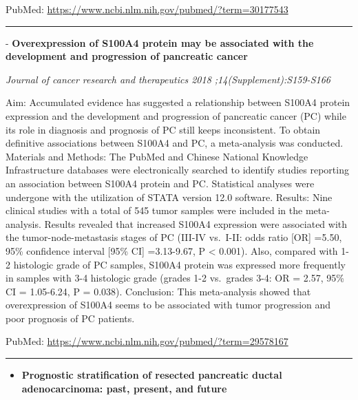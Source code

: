 \documentclass[]{article}
\providecommand{\tightlist}{%
  \setlength{\itemsep}{0pt}\setlength{\parskip}{0pt}}
\begin{document}
PubMed: \url{https://www.ncbi.nlm.nih.gov/pubmed/?term=30177543}

{}

{}

\begin{center}\rule{0.5\linewidth}{\linethickness}\end{center}

 - \textbf{Overexpression of S100A4 protein may be associated with the
development and progression of pancreatic cancer}

\emph{Journal of cancer research and therapeutics 2018
;14(Supplement):S159-S166}

Aim: Accumulated evidence has suggested a relationship between S100A4
protein expression and the development and progression of pancreatic
cancer (PC) while its role in diagnosis and prognosis of PC still keeps
inconsistent. To obtain definitive associations between S100A4 and PC, a
meta-analysis was conducted. Materials and Methods: The PubMed and
Chinese National Knowledge Infrastructure databases were electronically
searched to identify studies reporting an association between S100A4
protein and PC. Statistical analyses were undergone with the utilization
of STATA version 12.0 software. Results: Nine clinical studies with a
total of 545 tumor samples were included in the meta-analysis. Results
revealed that increased S100A4 expression were associated with the
tumor-node-metastasis stages of PC (III-IV vs.~I-II: odds ratio {[}OR{]}
=5.50, 95\% confidence interval {[}95\% CI{]} =3.13-9.67, P \textless{}
0.001). Also, compared with 1-2 histologic grade of PC samples, S100A4
protein was expressed more frequently in samples with 3-4 histologic
grade (grades 1-2 vs.~grades 3-4: OR = 2.57, 95\% CI = 1.05-6.24, P =
0.038). Conclusion: This meta-analysis showed that overexpression of
S100A4 seems to be associated with tumor progression and poor prognosis
of PC patients.

PubMed: \url{https://www.ncbi.nlm.nih.gov/pubmed/?term=29578167}

{}

{}

\begin{center}\rule{0.5\linewidth}{\linethickness}\end{center}

\begin{itemize}
\tightlist
\item
  \textbf{Prognostic stratification of resected pancreatic ductal
  adenocarcinoma: past, present, and future}
\end{itemize}
\end{document}
